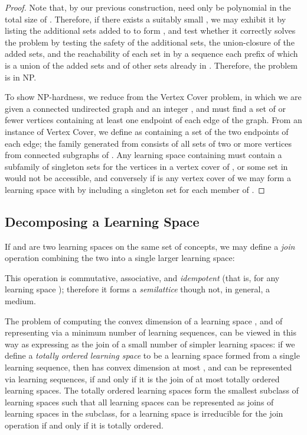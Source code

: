 \documentclass[11pt]{llncs}
\begin{document}
{\begin{proof}
Note that, by our previous construction,  need only be polynomial in the total size of .
Therefore, if there exists a suitably small , we may exhibit it by listing the additional sets
added to  to form , and test whether it correctly solves the problem by testing the safety of the additional sets, the union-closure of the added sets, and the reachability of each set in  by a sequence each prefix of which is a union of the added sets and of other sets already in .
Therefore, the problem is in NP.

To show NP-hardness, we reduce from the Vertex Cover problem, in which we are given a connected undirected graph  and an integer , and must find a set of  or fewer vertices containing at least one endpoint of each edge of the graph. From an instance of Vertex Cover, we define  as containing a set of the two endpoints of each edge; the family  generated from  consists of all sets of two or more vertices from connected subgraphs of .
Any learning space containing  must contain a subfamily of singleton sets for the vertices in a vertex cover of , or some set in  would not be accessible, and conversely if  is any vertex cover of  we may form a learning space  with  by including a singleton set for each member of .
\end{proof}

\subsection{Decomposing a Learning Space}

If  and  are two learning spaces on the same set of concepts, we may define a \emph{join} operation
combining the two into a single larger learning space:

This operation is commutative, associative, and \emph{idempotent} (that is,  for any learning space ); therefore it forms a \emph{semilattice} though not, in general, a medium.

The problem of computing the convex dimension of a learning space , and of representing  via a minimum number of learning sequences, can be viewed in this way as expressing  as the join of a small number of simpler learning spaces: if we define a \emph{totally ordered learning space} to be a learning space formed from a single learning sequence, then  has convex dimension at most , and can be represented via  learning sequences, if and only if it is the join of at most  totally ordered learning spaces. The totally ordered learning spaces form the smallest subclass of learning spaces such that all learning spaces can be represented as joins of learning spaces in the subclass, for a learning space is irreducible for the join operation if and only if it is totally ordered.

}
\end{document}
